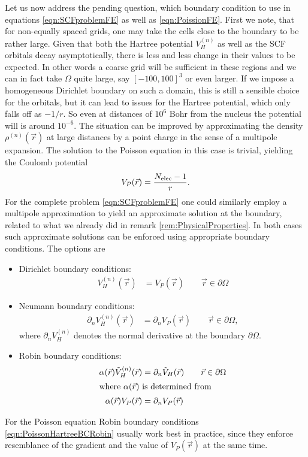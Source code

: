 Let us now address the pending question,
which boundary condition to use in equations
\eqref{eqn:SCFproblemFE} as well as \eqref{eqn:PoissionFE}.
First we note, that for non-equally spaced grids,
one may take the cells close to the boundary to be rather large.
Given that both the Hartree potential $V_H^{(n)}$ as well as the
SCF orbitals decay asymptotically,
there is less and less change in their values to be expected.
In other words a coarse grid will be sufficient in these regions
and we can in fact take $\Omega$ quite large,
say $[-100,100]^3$ or even larger.
If we impose a homogeneous Dirichlet boundary on such a domain,
this is still a sensible choice for the \SCF orbitals,
but it can lead to issues for the Hartree potential, which only falls off as $-1/r$.
So even at distances of $10^6$ Bohr from the nucleus the potential
will is around $10^{-6}$.
The situation can be improved by approximating the density $\rho^{(n)}(\vec{r})$
at large distances by a point charge in the sense of a multipole expansion.
The solution to the Poisson equation in this case is trivial,
yielding the Coulomb potential
\[ V_P(\vec{r}) = \frac{N_\text{elec} -1}{r}. \]
For the complete \SCF problem \eqref{eqn:SCFproblemFE}
one could similarly employ a multipole approximation
to yield an approximate solution at the boundary,
related to what we already did in remark
\vref{rem:PhysicalProperties}.
In both cases such approximate solutions can be enforced
using appropriate boundary conditions.
The options are
\begin{itemize}
	\item Dirichlet boundary conditions:
		\begin{align}
			V_H^{(n)}(\vec{r}) &= V_P(\vec{r}) \qquad \vec{r} \in \partial\Omega
			\label{eqn:PoissonHartreeBCDirichlet}
		\end{align}
	\item Neumann boundary conditions:
		\begin{align}
			\partial_n V_H^{(n)}(\vec{r}) &= \partial_n V_P(\vec{r}) \qquad \vec{r} \in \partial\Omega,
			\label{eqn:PoissonHartreeBCNeumann}
		\end{align}
		where $\partial_n V_H^{(n)}$ denotes the normal derivative at the boundary $\partial\Omega$.
	\item Robin boundary conditions:
		\begin{align}
			\label{eqn:PoissonHartreeBCRobin}
			\alpha(\vec{r}) \tilde{V}_H^{(n)}(\vec{r})
				&= \partial_n \tilde{V}_H(\vec{r}) \qquad \vec{r} \in \partial\Omega \\
		\intertext{where $\alpha(\vec{r})$ is determined from}
			\nonumber
			\alpha(\vec{r}) V_P(\vec{r}) &= \partial_n  V_P(\vec{r}) 
		\end{align}
\end{itemize}
For the Poisson equation Robin boundary conditions
\eqref{eqn:PoissonHartreeBCRobin} usually work best in practice,
since they enforce resemblance of the gradient and the value
of $V_P(\vec{r})$ at the same time.


